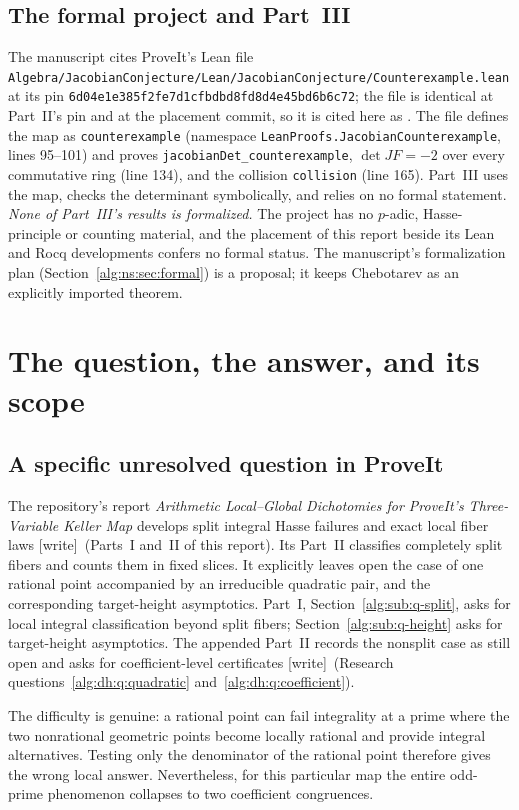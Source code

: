 \documentclass[11pt]{article}
\numberwithin{equation}{section}
\theoremstyle{plain}
\theoremstyle{plain}
\theoremstyle{plain}
\theoremstyle{definition}
\theoremstyle{definition}
\theoremstyle{definition}
\theoremstyle{remark}
\newcommand{\wtag}{\textup{[write]}}%
\newcommand{\rpath}[1]{\nolinkurl{#1}}
\newcommand{\nssha}{\nolinkurl{6d04e1e385f2fe7d1cfbdbd8fd8d4e45bd6b6c72}}
\begin{document}
\subsection{The formal project and Part~III}\label{alg:ns:sec:formalproject}
The manuscript cites ProveIt's Lean file
\rpath{Algebra/JacobianConjecture/Lean/JacobianConjecture/Counterexample.lean}
at its pin \nssha; the file is identical at Part~II's pin and at the
placement commit, so it is cited here as \cite{dh:proveitformal}. The file
defines the map as \texttt{counterexample} (namespace
\texttt{LeanProofs.JacobianCounterexample}, lines 95--101) and proves
\texttt{jacobianDet\_counterexample}, $\det JF=-2$ over every commutative
ring (line 134), and the collision \texttt{collision} (line 165). Part~III
uses the map, checks the determinant symbolically, and relies on no formal
statement. \emph{None of Part~III's results is formalized.} The project
has no $p$-adic, Hasse-principle or counting material, and the placement
of this report beside its Lean and Rocq developments confers no formal
status. The manuscript's formalization plan
(Section~\ref{alg:ns:sec:formal}) is a proposal; it keeps Chebotarev as an
explicitly imported theorem.

\section{The question, the answer, and its scope}\label{alg:ns:sec:intro}

\subsection{A specific unresolved question in ProveIt}
The repository's report \emph{Arithmetic Local--Global Dichotomies for
ProveIt's Three-Variable Keller Map} develops split integral Hasse
failures and exact local fiber laws \wtag{}~(Parts~I and~II of this
report). Its Part~II classifies
completely split fibers and counts them in fixed slices. It explicitly
leaves open the case of one rational point accompanied by an irreducible
quadratic pair, and the corresponding target-height asymptotics. Part~I,
Section~\ref{alg:sub:q-split}, asks for local integral classification beyond split fibers;
Section~\ref{alg:sub:q-height} asks for target-height asymptotics. The appended Part~II
records the nonsplit case as still open and asks for coefficient-level
certificates \wtag{}~(Research questions~\ref{alg:dh:q:quadratic}
and~\ref{alg:dh:q:coefficient}).

The difficulty is genuine: a rational point can fail integrality at a
prime where the two nonrational geometric points become locally rational
and provide integral alternatives. Testing only the denominator of the
rational point therefore gives the wrong local answer. Nevertheless,
for this particular map the entire odd-prime phenomenon collapses to
two coefficient congruences.
\end{document}

